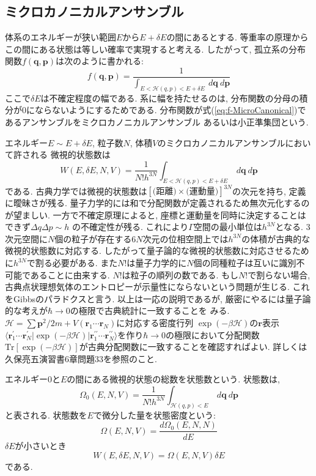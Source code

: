 \subsection{ミクロカノニカルアンサンブル}
体系のエネルギーが狭い範囲$E$から$E+\delta E$の間にあるとする.
等重率の原理からこの間にある状態は等しい確率で実現すると考える.
したがって, 孤立系の分布関数$f(\bm{q}, \bm{p})$は次のように書かれる:
\begin{equation}
 f(\bm{q}, \bm{p})
=\frac{1}{\int_{E < \mathcal{H}(q, p) < E+\delta E} ~d \bm{q}~d\bm{p}}
 \label{eq:f-MicroCanonical}
\end{equation}
ここで$\delta E$は不確定程度の幅である.
系に幅を持たせるのは, 分布関数の分母の積分が0にならないようにするためである.
分布関数が式(\ref{eq:f-MicroCanonical})であるアンサンブルをミクロカノニカルアンサンブル
あるいは小正準集団という.

エネルギー$E \sim E+\delta E$, 粒子数$N$, 体積$V$のミクロカノニカルアンサンブルにおいて許される
微視的状態数は
\begin{equation}
 W(E, \delta E, N, V)
=\frac{1}{N!h^{3N}} \int_{E < \mathcal{H}(q, p) < E + \delta E} ~ d\bm{q} ~ d\bm{p}
\end{equation}
である.
古典力学では微視的状態数は$[\text{(距離)} \times \text{(運動量)}]^{3N}$の次元を持ち,
定義に曖昧さが残る. 量子力学的には和で分配関数が定義されるため無次元化するのが望ましい.
一方で不確定原理によると, 座標と運動量を同時に決定することはできず$\Delta q \Delta p \sim h$
の不確定性が残る.
これにより$\Gamma$空間の最小単位は$h^{3N}$となる.
3次元空間に$N$個の粒子が存在する$6N$次元の位相空間上では$h^{3N}$の体積が古典的な微視的状態数に対応する.
したがって量子論的な微視的状態数に対応させるために$h^{3N}$で割る必要がある.
また$N!$は量子力学的に$N$個の同種粒子は互いに識別不可能であることに由来する.
$N!$は粒子の順列の数である.
もし$N!$で割らない場合, 古典点状理想気体のエントロピーが示量性にならないという問題が生じる.
これをGibbsのパラドクスと言う.
以上は一応の説明であるが, 厳密にやるには量子論的な考えが$\hbar \to 0$の極限で古典統計に一致することを
みる.
$\mathcal{H} = \sum \bm{p}^{2}/2m + V(\bm{r}_{1} \cdots \bm{r}_{N})$に対応する密度行列
$\exp(-\beta \mathcal{H})$の$\bm{r}$表示
$\langle \bm{r}_{1}^{\prime} \cdots \bm{r}_{N}^{\prime} | \exp(-\beta \mathcal{H}) | \bm{r}_{1}^{\prime \prime} \cdots \bm{r}_{N}^{\prime \prime} \rangle$を作り$\hbar \to 0$の極限において分配関数
$\mathrm{Tr}[\exp(-\beta \mathcal{H})]$が古典分配関数に一致することを確認すればよい.
詳しくは久保亮五演習書6章問題33を参照のこと.

エネルギー$0$と$E$の間にある微視的状態の総数を状態数という.
状態数は,
\begin{equation}
 \Omega_{0} (E, N, V)
=\frac{1}{N! h^{3N}}\int_{\mathcal{H}(q, p) < E} ~ d\bm{q} ~ d\bm{p}
\end{equation}
と表される. 状態数を$E$で微分した量を状態密度という:
\begin{equation}
 \Omega(E, N, V)
=\frac{d\Omega_{0}(E, N, N)}{dE}
\end{equation}
$\delta E$が小さいとき
\begin{equation}
 W(E, \delta E, N, V)
=\Omega(E, N, V)\delta E
\end{equation}
である.

